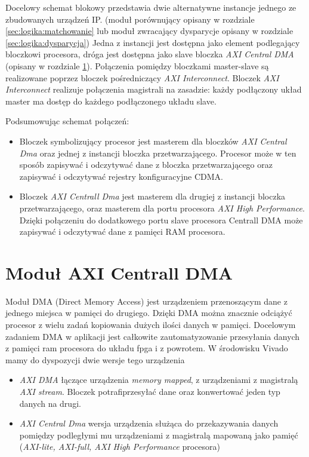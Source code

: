 Docelowy schemat blokowy przedstawia dwie alternatywne instancje jednego ze zbudowanych
urządzeń IP.
(moduł porównujący opisany w rozdziale \ref{sec:logika:matchowanie} lub moduł zwracający 
 dysparycje opisany w rozdziale \ref{sec:logika:dysparycja})
Jedna z instancji jest dostępna jako element podlegający bloczkowi procesora,
dróga jest dostępna jako slave bloczka \textit{AXI Central DMA}
(opisany w rozdziale \ref{sec:logika:cdma}).
Połączenia pomiędzy
bloczkami master-slave są realizowane poprzez bloczek pośredniczący \textit{AXI Interconnect}.
Bloczek \textit{AXI Interconnect} realizuje połączenia magistrali na zasadzie:
każdy podłączony układ master ma dostęp do każdego podłączonego układu slave.

Podsumowując schemat połączeń:
\begin{itemize}
\item Bloczek symbolizujący procesor jest masterem dla bloczków \textit{AXI Central Dma} oraz
jednej z instancji bloczka przetwarzającego. Procesor może w ten sposób zapisywać i odczytywać dane
z bloczka przetwarzającego oraz zapisywać i odczytywać rejestry konfiguracyjne CDMA.
\item Bloczek \textit{AXI Centrall Dma} jest masterem dla drugiej z instancji bloczka
przetwarzającego, oraz masterem dla portu procesora \textit{AXI High Performance}.
Dzięki połączeniu do dodatkowego portu slave procesora Centrall DMA może zapisywać
i odczytywać dane z pamięci RAM procesora.
\end{itemize}


\section{Moduł AXI Centrall DMA}
\label{sec:logika:cdma}

Moduł DMA (Direct Memory Access) jest urządzeniem przenoszącym dane z jednego miejsca w pamięci
do drugiego.
Dzięki DMA można znacznie odciążyć procesor z wielu zadań kopiowania dużych ilości
danych w pamięci. Docelowym zadaniem DMA w aplikacji jest całkowite zautomatyzowanie
przesyłania danych z pamięci ram procesora do układu fpga i z powrotem.
W środowisku Vivado mamy do dyspozycji dwie wersje tego urządzenia


\begin {itemize}
\item \textit{AXI DMA} łączące urządzenia \textit{memory mapped}, z
urządzeniami z magistralą \textit{AXI stream}. Bloczek potrafiprzesyłać dane oraz
konwertować jeden typ danych na drugi.
\item \textit{AXI Central Dma} wersja urządzenia służąca do przekazywania danych
pomiędzy podległymi mu urządzeniami z magistralą mapowaną jako pamięć
(\textit{AXI-lite, AXI-full, AXI High Performance} procesora)
\end{itemize}

